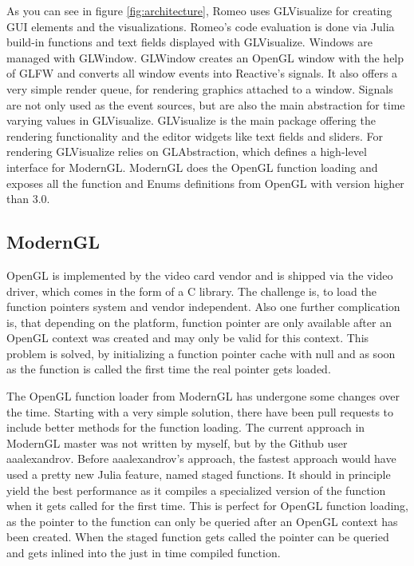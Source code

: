 As you can see in figure \ref{fig:architecture}, Romeo uses GLVisualize for creating \ac{GUI} elements and the visualizations. Romeo's code evaluation is done via Julia build-in functions and text fields displayed with GLVisualize.
Windows are managed with GLWindow. 
GLWindow creates an OpenGL window with the help of GLFW and converts all window events into Reactive's signals. 
It also offers a very simple render queue, for rendering graphics attached to a window.
Signals are not only used as the event sources, but are also the main abstraction for time varying values in GLVisualize.
GLVisualize is the main package offering the rendering functionality and the editor widgets like text fields and sliders.
For rendering GLVisualize relies on GLAbstraction, which defines a high-level interface for ModernGL.
ModernGL does the \ac{OpenGL} function loading and exposes all the function and Enums definitions from \ac{OpenGL} with version higher than 3.0.



\subsection{ModernGL}
\ac{OpenGL} is implemented by the video card vendor and is shipped via the video driver, which comes in the form of a C library.
The challenge is, to load the function pointers system and vendor independent. 
Also one further complication is, that depending on the platform, 
function pointer are only available after an \ac{OpenGL} context was created and may only be valid for this context. \cite{wgl}
This problem is solved, by initializing a function pointer cache with null and as soon as the function is called the first time the real pointer gets loaded.

The OpenGL function loader from ModernGL has undergone some changes over the time.
Starting with a very simple solution, there have been pull requests to include better methods for the function loading.
The current approach in ModernGL master was not written by myself, but by the Github user aaalexandrov.
Before aaalexandrov’s approach, the fastest approach would have used a pretty new Julia feature, named staged functions.
It should in principle yield the best performance as it compiles a specialized version of the function when it gets called for the first time. This is perfect for OpenGL function loading, as the pointer to the function can only be queried after an OpenGL context has been created. When the staged function gets called the pointer can be queried and gets inlined into the just in time compiled function.

